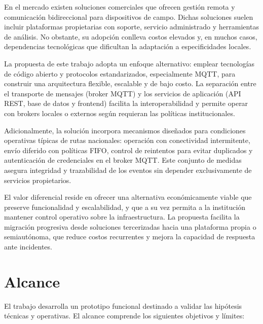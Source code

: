 En el mercado existen soluciones comerciales \cite{exemys} que ofrecen gestión remota y comunicación bidireccional para dispositivos de campo. Dichas soluciones suelen incluir plataformas propietarias con soporte, servicio administrado y herramientas de análisis. No obstante, su adopción conlleva costos elevados y, en muchos casos, dependencias tecnológicas que dificultan la adaptación a especificidades locales.

La propuesta de este trabajo adopta un enfoque alternativo: emplear tecnologías de código abierto y protocolos estandarizados, especialmente MQTT, para construir una arquitectura flexible, escalable y de bajo costo. La separación entre el transporte de mensajes (broker MQTT) y los servicios de aplicación (API REST, base de datos y frontend) facilita la interoperabilidad y permite operar con brokers locales o externos según requieran las políticas institucionales.

Adicionalmente, la solución incorpora mecanismos diseñados para condiciones operativas típicas de rutas nacionales: operación con conectividad intermitente, envío diferido con políticas FIFO, control de reintentos para evitar duplicados y autenticación de credenciales en el broker MQTT. Este conjunto de medidas asegura integridad y trazabilidad de los eventos sin depender exclusivamente de servicios propietarios.

El valor diferencial reside en ofrecer una alternativa económicamente viable que preserve funcionalidad y escalabilidad, y que a su vez permita a la institución mantener control operativo sobre la infraestructura. La propuesta facilita la migración progresiva desde soluciones tercerizadas hacia una plataforma propia o semiautónoma, que reduce costos recurrentes y mejora la capacidad de respuesta ante incidentes.


\section{Alcance}
El trabajo desarrolla un prototipo funcional destinado a validar las hipótesis técnicas y operativas. El alcance comprende los siguientes objetivos y límites:

